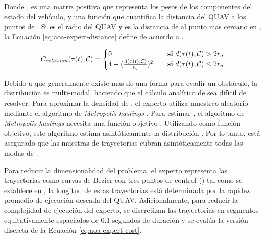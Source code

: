 Donde ,  es una matriz positiva que representa los pesos de los componentes del estado del vehículo, y  una función que cuantifica la distancia del QUAV a los puntos de . Si  es el radio del QUAV y  es la distancia de  al punto mas cercano en , la Ecuación \ref{eq:aoa-expert-distance} define  de acuerdo a \cite{Loquercio2021}.

\begin{equation}
\label{eq:aoa-expert-distance}
    C_{collision}(\tau(t), \mathcal{C}) = \begin{cases}
        0                                               & \quad\text{\textbf{si} } d(\tau(t), \mathcal{C}) > 2 r_q \\
        4 - (\frac{d(\tau(t), \mathcal{C})}{r_q})^{2}   & \quad\text{\textbf{si} } d(\tau(t), \mathcal{C}) \leq 2 r_q
    \end{cases}
\end{equation}

Debido a que generalmente existe mas de una forma para evadir un obstáculo, la distribución  es multi-modal, haciendo que el cálculo analítico de  sea difícil de resolver. Para aproximar la densidad de , el experto utiliza muestreo aleatorio mediante el algoritmo de \textit{Metropolis-hastings} \cite{hastings1970monte}. Para estimar , el algoritmo de \textit{Metropolis-hastings} necesita una función objetivo . Utilizando  como función objetivo, este algoritmo estima asintóticamente la distribución  \cite{Loquercio2021}. Por lo tanto, está asegurado que las muestras de trayectorias cubran asintóticamente todas las modas de .

Para reducir la dimensionalidad del problema, el experto representa las trayectorias \jim{\tau} como curvas de Bezier con tres puntos de control () tal como se establece en \cite{mellinger2011minimum}, la longitud de estas trayectorias está determinada por la rapidez promedio de ejecución deseada del QUAV. Adicionalmente, para reducir la complejidad de ejecución del experto, se discretizan las trayectorias en segmentos equitativamente espaciados de 0.1 segundos de duración y se evalúa la versión discreta de la Ecuación \ref{eq:aoa-expert-cost}.

